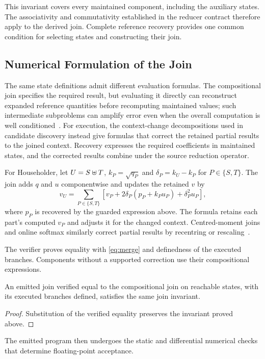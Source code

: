 This invariant covers every maintained component, including the auxiliary states.
The associativity and commutativity established in the reducer contract therefore apply to the derived join.
Complete reference recovery provides one common condition for selecting states and constructing their join.

\subsection{Numerical Formulation of the Join}
\label{sec:rebase}

The same state definitions admit different evaluation formulas.
The compositional join specifies the required result, but evaluating it directly can reconstruct expanded reference quantities before recomputing maintained values; such intermediate subproblems can amplify error even when the overall computation is well conditioned~\citep{higham_decomposition}.
For execution, the context-change decompositions used in candidate discovery instead give formulas that correct the retained partial results to the joined context.
Recovery expresses the required coefficients in maintained states, and the corrected results combine under the source reduction operator.

For Householder, let $U=S\uplus T$, $k_P=\sqrt{q_P}$ and $\delta_P=k_U-k_P$ for $P\in\{S,T\}$.
The join adds $q$ and $u$ componentwise and updates the retained $v$ by
\[
v_U=\sum_{P\in\{S,T\}}
 \left[v_P+2\delta_P(p_P+k_Pu_P)+\delta_P^2u_P\right],
\]
where $p_P$ is recovered by the guarded expression above.
The formula retains each part's computed $v_P$ and adjusts it for the changed context.
Centred-moment joins and online softmax similarly correct partial results by recentring or rescaling~\citep{pebay,milakov}.

The verifier proves equality with \eqref{eq:merge} and definedness of the executed branches.
Components without a supported correction use their compositional expressions.
\begin{theorem}
\label{thm:printed}
An emitted join verified equal to the compositional join on reachable states, with its executed branches defined, satisfies the same join invariant.
\end{theorem}
\begin{proof}
Substitution of the verified equality preserves the invariant proved above.
\end{proof}
The emitted program then undergoes the static and differential numerical checks that determine floating-point acceptance.
